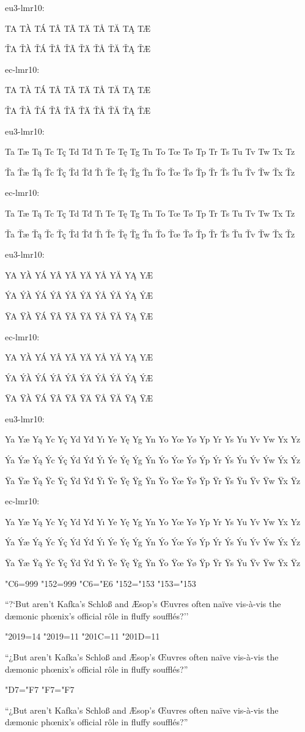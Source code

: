 eu3-lmr10:

TA TÀ TÁ TÂ TÃ TÄ TÅ TĂ TĄ TÆ

ŤA ŤÀ ŤÁ ŤÂ ŤÃ ŤÄ ŤÅ ŤĂ ŤĄ ŤÆ

{
\eclmr

ec-lmr10:

TA TÀ TÁ TÂ TÃ TÄ TÅ TĂ TĄ TÆ

ŤA ŤÀ ŤÁ ŤÂ ŤÃ ŤÄ ŤÅ ŤĂ ŤĄ ŤÆ
}

eu3-lmr10:

Ta Tæ Tą Tc Tç Td Tđ Tı Te Tę Tg Tn To Tœ Tø Tp Tr Ts Tu Tv Tw Tx Tz

Ťa Ťæ Ťą Ťc Ťç Ťd Ťđ Ťı Ťe Ťę Ťg Ťn Ťo Ťœ Ťø Ťp Ťr Ťs Ťu Ťv Ťw Ťx Ťz

{
\eclmr

ec-lmr10:

Ta Tæ Tą Tc Tç Td Tđ Tı Te Tę Tg Tn To Tœ Tø Tp Tr Ts Tu Tv Tw Tx Tz

Ťa Ťæ Ťą Ťc Ťç Ťd Ťđ Ťı Ťe Ťę Ťg Ťn Ťo Ťœ Ťø Ťp Ťr Ťs Ťu Ťv Ťw Ťx Ťz
}

eu3-lmr10:

YA YÀ YÁ YÂ YÃ YÄ YÅ YĂ YĄ YÆ

ÝA ÝÀ ÝÁ ÝÂ ÝÃ ÝÄ ÝÅ ÝĂ ÝĄ ÝÆ

ŸA ŸÀ ŸÁ ŸÂ ŸÃ ŸÄ ŸÅ ŸĂ ŸĄ ŸÆ

{
\eclmr

ec-lmr10:

YA YÀ YÁ YÂ YÃ YÄ YÅ YĂ YĄ YÆ

ÝA ÝÀ ÝÁ ÝÂ ÝÃ ÝÄ ÝÅ ÝĂ ÝĄ ÝÆ

ŸA ŸÀ ŸÁ ŸÂ ŸÃ ŸÄ ŸÅ ŸĂ ŸĄ ŸÆ
}

eu3-lmr10:

Ya Yæ Yą Yc Yç Yd Yđ Yı Ye Yę Yg Yn Yo Yœ Yø Yp Yr Ys Yu Yv Yw Yx Yz

Ýa Ýæ Ýą Ýc Ýç Ýd Ýđ Ýı Ýe Ýę Ýg Ýn Ýo Ýœ Ýø Ýp Ýr Ýs Ýu Ýv Ýw Ýx Ýz

Ÿa Ÿæ Ÿą Ÿc Ÿç Ÿd Ÿđ Ÿı Ÿe Ÿę Ÿg Ÿn Ÿo Ÿœ Ÿø Ÿp Ÿr Ÿs Ÿu Ÿv Ÿw Ÿx Ÿz

{
\eclmr

ec-lmr10:

Ya Yæ Yą Yc Yç Yd Yđ Yı Ye Yę Yg Yn Yo Yœ Yø Yp Yr Ys Yu Yv Yw Yx Yz

Ýa Ýæ Ýą Ýc Ýç Ýd Ýđ Ýı Ýe Ýę Ýg Ýn Ýo Ýœ Ýø Ýp Ýr Ýs Ýu Ýv Ýw Ýx Ýz

Ÿa Ÿæ Ÿą Ÿc Ÿç Ÿd Ÿđ Ÿı Ÿe Ÿę Ÿg Ÿn Ÿo Ÿœ Ÿø Ÿp Ÿr Ÿs Ÿu Ÿv Ÿw Ÿx Ÿz
}

\sfcode"C6=999
\sfcode"152=999
\lccode"C6="E6 %
\lccode"152="153 %
\lccode"153="153

``?`But aren't Kafka's Schloß and Æsop's Œuvres
often naïve vis-à-vis the dæmonic phœnix's official rôle
in fluffy soufflés?''

\kcatcode"2019=14
\catcode"2019=11
\catcode"201C=11
\catcode"201D=11

“¿But aren’t Kafka’s Schloß and Æsop’s Œuvres
often naïve vis-à-vis the dæmonic phœnix’s official rôle
in fluffy soufflés?”

{
\eclmr
\lccode"D7="F7 %
\lccode"F7="F7

“¿But aren’t Kafka’s Schloß and Æsop’s Œuvres
often naïve vis-à-vis the dæmonic phœnix’s official rôle
in fluffy soufflés?”
}

\bye
